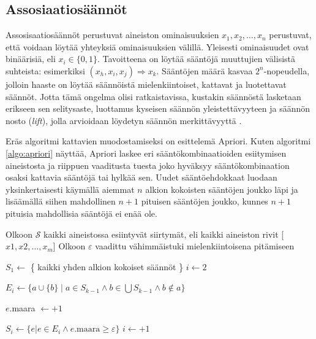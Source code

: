 \documentclass[finnish,gradu,twoside,12pt]{tktltiki}
\begin{document}
{\subsection{Assosiaatiosäännöt}

Assosisaatiosäännöt perustuvat aineiston ominaisuuksien $x_1, x_2, \ldots, x_n$ perustuvat, että voidaan löytää yhteyksiä ominaisuuksien välillä. Yleisesti ominaisuudet ovat binäärisiä, eli $x_i \in \{ 0, 1\}$. Tavoitteena on löytää sääntöjä muuttujien välisistä suhteista: esimerkiksi $(x_h, x_i, x_j) \Rightarrow x_k$. Sääntöjen määrä kasvaa $2^n$-nopeudella, jolloin haaste on löytää säännöistä mielenkiintoiset, kattavat ja luotettavat säännöt. Jotta tämä ongelma olisi ratkaistavissa, kustakin säännöstä lasketaan erikseen sen selitysaste, luottamus kyseisen säännön yleistettävyyteen ja säännön nosto (\textit{lift}), jolla arvioidaan löydetyn säännön merkittävyyttä \citep[485--586]{Hastie2009}.

Eräs algoritmi kattavien muodostamiseksi on \citet{Agrawal1994a} esittelemä Apriori. Kuten algoritmi \ref{algo:apriori} näyttää, Apriori laskee eri sääntökombinaatioiden esiitymisen aineistosta ja riippuen vaaditusta tuesta joko hyväksyy sääntökombinaation osaksi kattavia sääntöjä tai hylkää sen. Uudet sääntöehdokkaat luodaan yksinkertaisesti käymällä aiemmat $n$ alkion kokoisten sääntöjen joukko läpi ja lisäämällä siihen mahdollinen $n+1$ pituisen sääntöjen joukko, kunnes $n+1$ pituisia mahdollisia sääntöjä ei enää ole.

\begin{algorithm}
\begin{algorithmic}
\State Olkoon $\mathcal{S}$ kaikki aineistossa esiintyvät siirtymät, eli kaikki aineiston rivit [$x1, x2, \ldots, x_m$]
\State Olkoon $\varepsilon$ vaadittu vähimmäistuki mielenkiintoisena pitämiseen

\State $S_1 \gets $ \{ kaikki yhden alkion kokoiset säännöt \}
\State $i \gets 2$


  \State $E_i \gets \{ a \cup \{b\} \mid a \in S_{k-1} \land b \in \bigcup S_{k-1} \land b \not \in a \} $

		   \State $e$.maara $ \gets + 1$
		\EndFor

	\EndFor 

		\State $S_i \gets \{ e | e \in E_i \land e.\mathrm{maara} \geq \varepsilon \}$
		\State $i \gets +1$
\EndWhile


\end{algorithmic}
\end{algorithm}}
\end{document}
